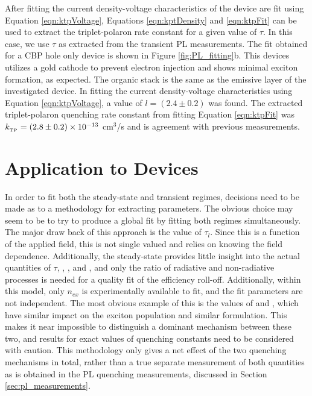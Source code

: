 \documentclass[../thesis.tex]{subfiles}
\begin{document}
After fitting the current density-voltage characteristics of the device are fit using Equation \ref{eqn:ktpVoltage}, Equations \ref{eqn:kptDensity} and \ref{eqn:ktpFit} can be used to extract the triplet-polaron rate constant for a given value of $\tau$.  
In this case, we use $\tau$ as extracted from the transient PL measurements.
The fit obtained for a CBP \irppy hole only device is shown in Figure \ref{fig:PL_fitting}b.
This devices utilizes a gold cathode to prevent electron injection and shows minimal exciton formation, as expected.
The organic stack is the same as the emissive layer of the investigated device.  
In fitting the current density-voltage characteristics using Equation \ref{eqn:ktpVoltage}, a value of $l=(2.4\pm0.2)$ was found.  
The extracted triplet-polaron quenching rate constant from fitting Equation \ref{eqn:ktpFit} was $k_{_\text{\tiny TP}}=(2.8\pm0.2)\times 10^{-13}$ cm$^3$/s and is agreement with previous measurements.\supercite{Erickson2014,Reineke2007}


\section{Application to Devices}

In order to fit both the steady-state and transient regimes, decisions need to be made as to a methodology for extracting parameters.  
The obvious choice may seem to be to try to produce a global fit by fitting both regimes simultaneously.  
The major draw back of this approach is the value of $\tau_l$.  
Since this is a function of the applied field, this is not single valued and relies on knowing the field dependence.
Additionally, the steady-state provides little insight into the actual quantities of $\tau$, \ktt, \ktp, and \kf, and only the ratio of radiative and non-radiative processes is needed for a quality fit of the efficiency roll-off.
Additionally, within this model, only $n_{ex}$ is experimentally available to fit, and the fit parameters are not independent.
The most obvious example of this is the values of \ktt and \ktp, which have similar impact on the exciton population and similar formulation.  
This makes it near impossible to distinguish a dominant mechanism between these two, and results for exact values of quenching constants need to be considered with caution.
This methodology only gives a net effect of the two quenching mechanisms in total, rather than a true separate measurement of both quantities as is obtained in the PL quenching measurements, discussed in Section \ref{sec:pl_measurements}.
\end{document}
